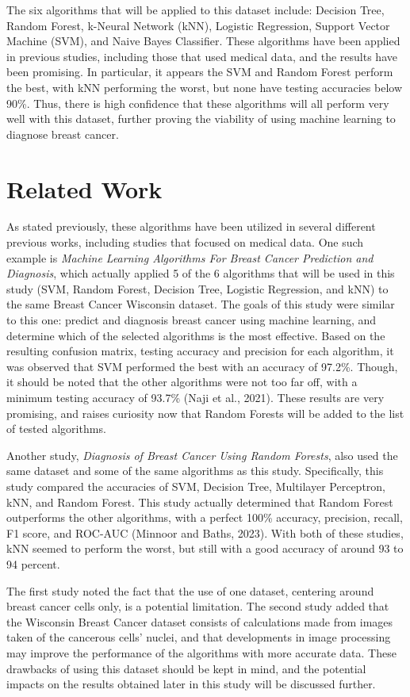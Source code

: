 \documentclass[conference]{IEEEtran}
\begin{document}
The six algorithms that will be applied to this dataset include: Decision Tree, Random Forest, k-Neural Network (kNN), Logistic Regression, Support Vector Machine (SVM), and Naive Bayes Classifier. These algorithms have been applied in previous studies, including those that used medical data, and the results have been promising. In particular, it appears the SVM and Random Forest perform the best, with kNN performing the worst, but none have testing accuracies below 90\%. Thus, there is high confidence that these algorithms will all perform very well with this dataset, further proving the viability of using machine learning to diagnose breast cancer.

\section{Related Work}
As stated previously, these algorithms have been utilized in several different previous works, including studies that focused on medical data. One such example is \textit{Machine Learning Algorithms For Breast Cancer Prediction and Diagnosis}, which actually applied 5 of the 6 algorithms that will be used in this study (SVM, Random Forest, Decision Tree, Logistic Regression, and kNN) to the same Breast Cancer Wisconsin dataset. The goals of this study were similar to this one: predict and diagnosis breast cancer using machine learning, and determine which of the selected algorithms is the most effective. Based on the resulting confusion matrix, testing accuracy and precision for each algorithm, it was observed that SVM performed the best with an accuracy of 97.2\%. Though, it should be noted that the other algorithms were not too far off, with a minimum testing accuracy of 93.7\% (Naji et al., 2021). These results are very promising, and raises curiosity now that Random Forests will be added to the list of tested algorithms.

Another study, \textit{Diagnosis of Breast Cancer Using Random Forests}, also used the same dataset and some of the same algorithms as this study. Specifically, this study compared the accuracies of SVM, Decision Tree, Multilayer Perceptron, kNN, and Random Forest. This study actually determined that Random Forest outperforms the other algorithms, with a perfect 100\% accuracy, precision, recall, F1 score, and ROC-AUC (Minnoor and Baths, 2023). With both of these studies, kNN seemed to perform the worst, but still with a good accuracy of around 93 to 94 percent.

The first study noted the fact that the use of one dataset, centering around breast cancer cells only, is a potential limitation. The second study added that the Wisconsin Breast Cancer dataset consists of calculations made from images taken of the cancerous cells' nuclei, and that developments in image processing may improve the performance of the algorithms with more accurate data. These drawbacks of using this dataset should be kept in mind, and the potential impacts on the results obtained later in this study will be discussed further.
\end{document}

